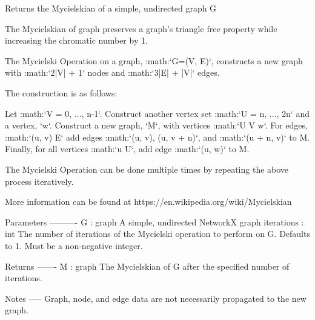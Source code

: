 \begin{DoxyVerb}Returns the Mycielskian of a simple, undirected graph G

The Mycielskian of graph preserves a graph's triangle free
property while increasing the chromatic number by 1.

The Mycielski Operation on a graph, :math:`G=(V, E)`, constructs a new
graph with :math:`2|V| + 1` nodes and :math:`3|E| + |V|` edges.

The construction is as follows:

Let :math:`V = {0, ..., n-1}`. Construct another vertex set
:math:`U = {n, ..., 2n}` and a vertex, `w`.
Construct a new graph, `M`, with vertices :math:`U \bigcup V \bigcup w`.
For edges, :math:`(u, v) \in E` add edges :math:`(u, v), (u, v + n)`, and
:math:`(u + n, v)` to M. Finally, for all vertices :math:`u \in U`, add
edge :math:`(u, w)` to M.

The Mycielski Operation can be done multiple times by repeating the above
process iteratively.

More information can be found at https://en.wikipedia.org/wiki/Mycielskian

Parameters
----------
G : graph
    A simple, undirected NetworkX graph
iterations : int
    The number of iterations of the Mycielski operation to
    perform on G. Defaults to 1. Must be a non-negative integer.

Returns
-------
M : graph
    The Mycielskian of G after the specified number of iterations.

Notes
-----
Graph, node, and edge data are not necessarily propagated to the new graph.\end{DoxyVerb}
 
